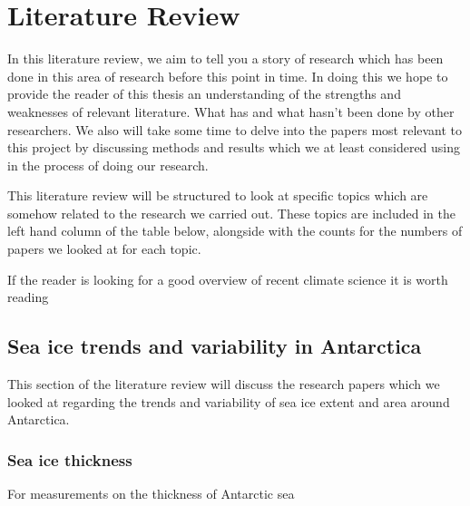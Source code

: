 \documentclass[../main.tex]{subfiles}
\begin{document}
\chapter{Literature Review}
In this literature review, we aim to tell you a story of research which has been done in this area of research before this point in time. In doing this we hope to provide the reader of this thesis an understanding of the strengths and weaknesses of relevant literature. What has and what hasn't been done by other researchers. We also will take some time to delve into the papers most relevant to this project by discussing methods and results which we at least considered using in the process of doing our research.\medskip

This literature review will be structured to look at specific topics which are somehow related to the research we carried out. These topics are included in the left hand column of the table below, alongside with the counts for the numbers of papers we looked at for each topic.

If the reader is looking for a good overview of recent climate science it is worth reading \cite{Clem2016}


\section{Sea ice trends and variability in Antarctica}
This section of the literature review will discuss the research papers which we looked at regarding the trends and variability of sea ice extent and area around Antarctica.

\subsection*{Sea ice thickness}
For measurements on the thickness of Antarctic sea
\end{document}

